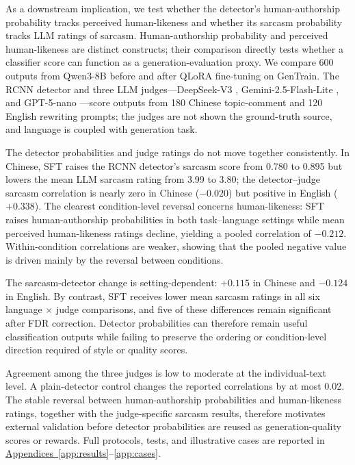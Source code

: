 \documentclass[11pt]{article}
\begin{document}
As a downstream implication, we test whether the detector's human-authorship probability tracks perceived human-likeness and whether its sarcasm probability tracks LLM ratings of sarcasm. Human-authorship probability and perceived human-likeness are distinct constructs; their comparison directly tests whether a classifier score can function as a generation-evaluation proxy. We compare 600 outputs from Qwen3-8B \citep{qwen2025} before and after QLoRA \citep{dettmers2023qlora} fine-tuning on GenTrain. The RCNN detector and three LLM judges---DeepSeek-V3 \citep{deepseek2024v3}, Gemini-2.5-Flash-Lite \citep{googledeepmind2025gemini25flashlite}, and GPT-5-nano \citep{openai2025gpt5}---score outputs from 180 Chinese topic-comment and 120 English rewriting prompts; the judges are not shown the ground-truth source, and language is coupled with generation task.

The detector probabilities and judge ratings do not move together consistently. In Chinese, SFT raises the RCNN detector's sarcasm score from 0.780 to 0.895 but lowers the mean LLM sarcasm rating from 3.99 to 3.80; the detector--judge sarcasm correlation is nearly zero in Chinese ($-0.020$) but positive in English ($+0.338$). The clearest condition-level reversal concerns human-likeness: SFT raises human-authorship probabilities in both task--language settings while mean perceived human-likeness ratings decline, yielding a pooled correlation of $-0.212$. Within-condition correlations are weaker, showing that the pooled negative value is driven mainly by the reversal between conditions.

The sarcasm-detector change is setting-dependent: $+0.115$ in Chinese and $-0.124$ in English. By contrast, SFT receives lower mean sarcasm ratings in all six language $\times$ judge comparisons, and five of these differences remain significant after FDR correction. Detector probabilities can therefore remain useful classification outputs while failing to preserve the ordering or condition-level direction required of style or quality scores.

Agreement among the three judges is low to moderate at the individual-text level. A plain-detector control changes the reported correlations by at most 0.02. The stable reversal between human-authorship probabilities and human-likeness ratings, together with the judge-specific sarcasm results, therefore motivates external validation before detector probabilities are reused as generation-quality scores or rewards. Full protocols, tests, and illustrative cases are reported in \hyperref[app:results]{Appendices~\ref*{app:results}}--\hyperref[app:cases]{\ref*{app:cases}}.
\end{document}
